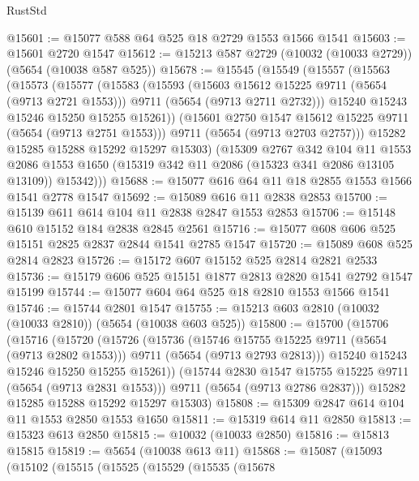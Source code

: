 \begin{lexlean}{RustStd}
\begin{coremodule}
@15601 := @15077 @588 @64 @525 @18 @2729 @1553 @1566 @1541
@15603 := @15601 @2720 @1547
@15612 := @15213 @587 @2729 (@10032 (@10033 @2729)) (@5654 (@10038 @587 @525))
@15678 := @15545
    (@15549
      (@15557
        (@15563
          (@15573
            (@15577
              (@15583
                (@15593
                  (@15603 @15612 @15225 @9711 (@5654 (@9713 @2721 @1553)))
                  @9711
                  (@5654 (@9713 @2711 @2732)))
                @15240
                @15243
                @15246
                @15250
                @15255
                @15261))
            (@15601 @2750 @1547 @15612 @15225 @9711 (@5654 (@9713 @2751 @1553)))
            @9711
            (@5654 (@9713 @2703 @2757)))
          @15282
          @15285
          @15288
          @15292
          @15297
          @15303)
        (@15309
          @2767
          @342
          @104
          @11
          @1553
          @2086
          @1553
          @1650
          (@15319 @342 @11 @2086 (@15323 @341 @2086 @13105 @13109))
          @15342)))
@15688 := @15077 @616 @64 @11 @18 @2855 @1553 @1566 @1541 @2778 @1547
@15692 := @15089 @616 @11 @2838 @2853
@15700 := @15139 @611 @614 @104 @11 @2838 @2847 @1553 @2853
@15706 := @15148 @610 @15152 @184 @2838 @2845 @2561
@15716 := @15077 @608 @606 @525 @15151 @2825 @2837 @2844 @1541 @2785 @1547
@15720 := @15089 @608 @525 @2814 @2823
@15726 := @15172 @607 @15152 @525 @2814 @2821 @2533
@15736 := @15179 @606 @525 @15151 @1877 @2813 @2820 @1541 @2792 @1547 @15199
@15744 := @15077 @604 @64 @525 @18 @2810 @1553 @1566 @1541
@15746 := @15744 @2801 @1547
@15755 := @15213 @603 @2810 (@10032 (@10033 @2810)) (@5654 (@10038 @603 @525))
@15800 := @15700
    (@15706
      (@15716
        (@15720
          (@15726
            (@15736
              (@15746 @15755 @15225 @9711 (@5654 (@9713 @2802 @1553)))
              @9711
              (@5654 (@9713 @2793 @2813)))
            @15240
            @15243
            @15246
            @15250
            @15255
            @15261))
        (@15744 @2830 @1547 @15755 @15225 @9711 (@5654 (@9713 @2831 @1553)))
        @9711
        (@5654 (@9713 @2786 @2837)))
      @15282
      @15285
      @15288
      @15292
      @15297
      @15303)
@15808 := @15309 @2847 @614 @104 @11 @1553 @2850 @1553 @1650
@15811 := @15319 @614 @11 @2850
@15813 := @15323 @613 @2850
@15815 := @10032 (@10033 @2850)
@15816 := @15813 @15815
@15819 := @5654 (@10038 @613 @11)
@15868 := @15087
    (@15093
      (@15102
        (@15515
          (@15525
            (@15529
              (@15535
                (@15678

\end{coremodule}
\end{lexlean}
